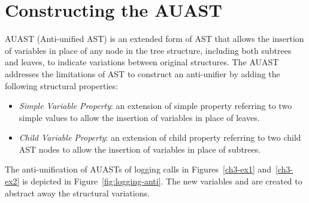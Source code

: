 
\section{Constructing the AUAST} \label{AUAST}  
AUAST (Anti-unified AST) is an extended form of AST that allows the insertion of variables in place of any node in the tree structure, including both subtrees and leaves, to indicate variations between original structures. The AUAST addresses the limitations of AST to construct an anti-unifier by adding the following structural properties:
\begin{itemize} [leftmargin=.4in]
\item \textit{Simple Variable Property}: an extension of simple property referring to two simple values to allow the insertion of variables in place of leaves.
\end{itemize}
\begin{itemize} [leftmargin=.4in]
\item \textit{Child Variable Property}: an extension of child property referring to two child AST nodes to allow the insertion of variables in place of subtrees.
\end{itemize}
The anti-unification of AUASTs of logging calls in Figures~\ref{ch3-ex1} and~\ref{ch3-ex2} is depicted in Figure~\ref{fig:logging-anti}. The new variables  and  are created to abstract away the structural variations. 


